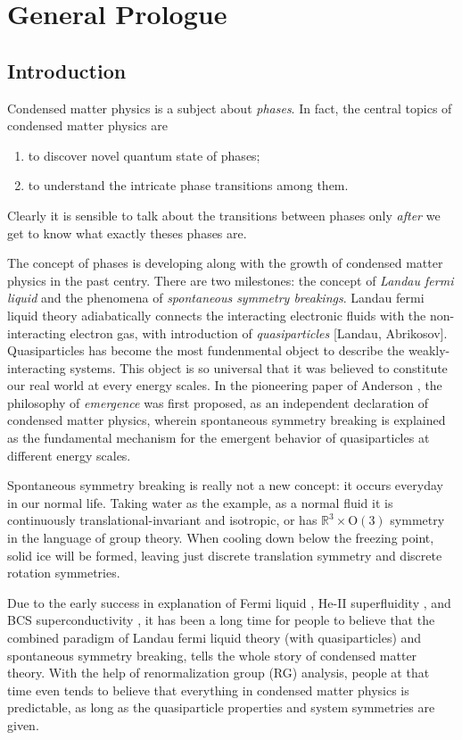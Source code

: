 \chapter{General Prologue}
\section{Introduction}
Condensed matter physics is a subject about \emph{phases}. In fact, the central topics of condensed matter physics are
\begin{enumerate}
    \item to discover novel quantum state of phases;
    \item to understand the intricate phase transitions among them.
\end{enumerate}
Clearly it is sensible to talk about the transitions between phases only \emph{after} we get to know what exactly theses phases are.

The concept of phases is developing along with the growth of condensed matter physics in the past centry. There are two milestones: the concept of \emph{Landau fermi liquid} and the phenomena of \emph{spontaneous symmetry breakings}. Landau fermi liquid theory adiabatically connects the interacting electronic fluids with the non-interacting electron gas, with introduction of \emph{quasiparticles} [Landau, Abrikosov]. Quasiparticles has become the most fundenmental object to describe the weakly-interacting systems. This object is so universal that it was believed to constitute our real world at every energy scales. In the pioneering paper of Anderson \cite{anderson1972more}, the philosophy of \emph{emergence} was first proposed, as an independent declaration of condensed matter physics, wherein spontaneous symmetry breaking is explained as the fundamental mechanism for the emergent behavior of quasiparticles at different energy scales.

Spontaneous symmetry breaking is really not a new concept: it occurs everyday in our normal life. Taking water as the example, as a normal fluid it is continuously translational-invariant and isotropic, or has $\mathbb R^3\times\mathrm{O}(3)$ symmetry in the language of group theory. When cooling down below the freezing point, solid ice will be formed, leaving just discrete translation symmetry and discrete rotation symmetries.


Due to the early success in explanation of Fermi liquid \cite{landau1959theory}, He-II superfluidity \cite{landau1941theory}, and BCS superconductivity \cite{bardeen1957theory,bardeen1957microscopic}, it has been a long time for people to believe that the combined paradigm of Landau fermi liquid theory (with quasiparticles) and spontaneous symmetry breaking, tells the whole story of condensed matter theory. With the help of renormalization group (RG) analysis, people at that time even tends to believe that everything in condensed matter physics is predictable, as long as the quasiparticle properties and system symmetries are given.

